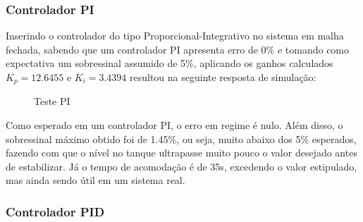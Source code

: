 \documentclass[
	article,			%
	11pt,				%
	oneside,			%
	a4paper,			%
	section=TITLE,		%
	english,			%
	brazil,				%
	sumario=tradicional
	]{abntex2}
\newcommand{\xPID}{130}%
\newcommand{\yPID}{1.2}%
\begin{document}
\subsubsection{Controlador PI}
Inserindo o controlador do tipo Proporcional-Integrativo no sistema em malha fechada, sabendo que um controlador PI apresenta erro de 0\% e tomando como expectativa um sobressinal assumido de 5\%, aplicando os ganhos calculados $K_p = 12.6455$ e $K_i = 3.4394$ resultou na seguinte resposta de simulação:

\begin{figure}[H]
    \centering
    \caption{Teste PI}
    \label{fig:comp-modelos-PI}
\end{figure}

Como esperado em um controlador PI, o erro em regime é nulo. Além disso, o sobressinal máximo obtido foi de 1.45\%, ou seja, muito abaixo dos 5\% esperados, fazendo com que o nível no tanque ultrapasse muito pouco o valor desejado antes de estabilizar. Já o tempo de acomodação é de 35s, excedendo o valor estipulado, mas ainda sendo útil em um sistema real.
    
\subsubsection{Controlador PID}
\end{document}
